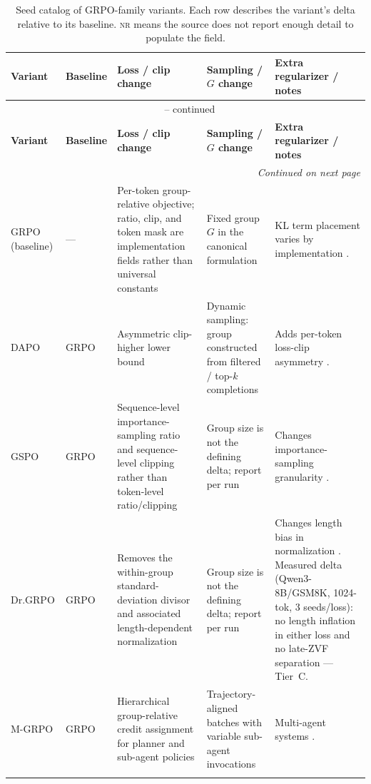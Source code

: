 \documentclass[11pt]{article}
\newcommand{\nr}{\textsc{nr}}
\newcommand{\grpo}{\textsc{GRPO}}
\begin{document}
\begin{longtable}{@{}p{2.1cm}p{2.4cm}p{3.0cm}p{2.0cm}p{3.3cm}@{}}
\caption{Seed catalog of \grpo{}-family variants. Each row describes the
  variant's delta relative to its baseline. \nr{} means the source does not
  report enough detail to populate the field.}\\
\toprule
\textbf{Variant} & \textbf{Baseline} & \textbf{Loss / clip change} &
\textbf{Sampling / $G$ change} & \textbf{Extra regularizer / notes}\\
\midrule
\endfirsthead
\multicolumn{5}{c}{\tablename\ \thetable{} -- continued}\\
\toprule
\textbf{Variant} & \textbf{Baseline} & \textbf{Loss / clip change} &
\textbf{Sampling / $G$ change} & \textbf{Extra regularizer / notes}\\
\midrule
\endhead
\midrule
\multicolumn{5}{r}{\textit{Continued on next page}}\\
\endfoot
\bottomrule
\endlastfoot

\grpo{} (baseline) & --- & Per-token group-relative objective; ratio, clip,
  and token mask are implementation fields rather than universal constants &
  Fixed group $G$ in the canonical formulation & KL term placement varies by
  implementation \cite{zvfaudit2026}.\\
\addlinespace

DAPO & \grpo{} & Asymmetric clip-higher lower bound & Dynamic sampling:
  group constructed from filtered / top-$k$ completions & Adds per-token
  loss-clip asymmetry \cite{yu2025dapo}.\\
\addlinespace

GSPO & \grpo{} & Sequence-level importance-sampling ratio and sequence-level
  clipping rather than token-level ratio/clipping & Group size is not the
  defining delta; report per run & Changes
  importance-sampling granularity \cite{qwen2025gspo}.\\
\addlinespace

Dr.\grpo{} & \grpo{} & Removes the within-group standard-deviation divisor and
  associated length-dependent normalization & Group size is not the defining
  delta; report per run & Changes
  length bias in normalization \cite{tong2025drgrpo}. Measured delta
  (Qwen3-8B/GSM8K, 1024-tok, 3 seeds/loss): no length inflation in either
  loss and no late-ZVF separation --- Tier~C.\\
\addlinespace

M-\grpo{} & \grpo{} & Hierarchical group-relative credit assignment for
  planner and sub-agent policies & Trajectory-aligned batches with variable
  sub-agent invocations & Multi-agent systems \cite{hong2025mgrpo}.\\
\addlinespace


\end{longtable}
\end{document}
